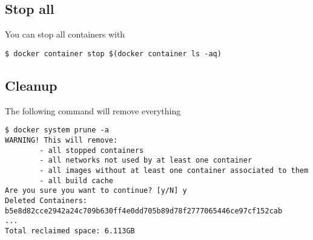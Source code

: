 \documentclass[14pt,a4paper]{article}
\begin{document}
\subsection{Stop all}
You can stop all containers with
\begin{verbatim}
$ docker container stop $(docker container ls -aq)
\end{verbatim}

\subsection{Cleanup}
The following command will remove everything
\begin{verbatim}
$ docker system prune -a
WARNING! This will remove:
        - all stopped containers
        - all networks not used by at least one container
        - all images without at least one container associated to them
        - all build cache
Are you sure you want to continue? [y/N] y
Deleted Containers:
b5e8d82cce2942a24c709b630ff4e0dd705b89d78f2777065446ce97cf152cab
...
Total reclaimed space: 6.113GB
\end{verbatim}

  
     
\end{document}
